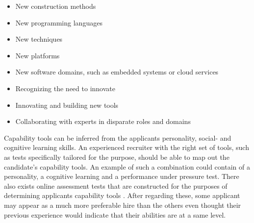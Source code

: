 \documentclass[11pt,a4paper,oneside,article]{memoir}
\begin{document}
\vspace{-17pt} 
\begin{itemize}
\item New construction methods
\item New programming languages
\item New techniques
\item New platforms
\item New software domains, such as embedded systems or cloud services
\item Recognizing the need to innovate
\item Innovating and building new tools
\item Collaborating with experts in disparate roles and domains \cite[p.~10]{mcculler:book}
\end{itemize}
\vspace{-17pt}

Capability tools can be inferred from the applicants personality, social- and cognitive learning skills. An experienced recruiter with the right set of tools, such as tests specifically tailored for the purpose, should be able to map out the candidate's capability tools. An example of such a combination could contain of a personality, a cognitive learning and a performance under pressure test. There also exists online assessment tests that are constructed for the purposes of determining applicants capability tools \cite{cute}. After regarding these, some applicant may appear as a much more preferable hire than the others even thought their previous experience would indicate that their abilities are at a same level.
\end{document}
